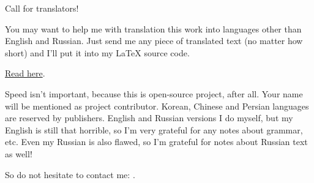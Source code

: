 \vspace*{\fill}

\Huge Call for translators!

\normalsize

\bigskip
\bigskip
\bigskip

You may want to help me with translation this work into languages other than English and Russian.
Just send me any piece of translated text (no matter how short) and I'll put it into my LaTeX source code.

\href{https://github.com/dennis714/RE-for-beginners/blob/master/Translation.md}{Read here}.

Speed isn't important, because this is open-source project, after all.
Your name will be mentioned as project contributor.
Korean, Chinese and Persian languages are reserved by publishers.
English and Russian versions I do myself, but my English is still that horrible, so I'm very grateful for any notes about grammar, etc.
Even my Russian is also flawed, so I'm grateful for notes about Russian text as well!%

So do not hesitate to contact me: \GTT{\EMAIL}.

\vspace*{\fill}
\vfill
